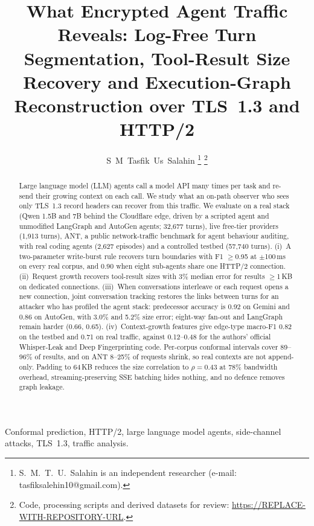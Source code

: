 \documentclass[journal]{IEEEtran}
\newcommand{\repourl}{\url{https://REPLACE-WITH-REPOSITORY-URL}} %
\begin{document}
\title{What Encrypted Agent Traffic Reveals: Log-Free Turn Segmentation, Tool-Result Size Recovery and Execution-Graph Reconstruction over TLS~1.3 and HTTP/2}
\author{S~M~Tasfik~Us~Salahin
\thanks{S.~M.~T.~U.~Salahin is an independent researcher (e-mail: tasfiksalehin10@gmail.com).}
\thanks{Code, processing scripts and derived datasets for review: \repourl.}}
\maketitle

\begin{abstract}
Large language model (LLM) agents call a model API many times per task and re-send their growing context on each call. We study what an on-path observer who sees only TLS~1.3 record headers can recover from this traffic. We evaluate on a real stack (Qwen 1.5B and 7B behind the Cloudflare edge, driven by a scripted agent and unmodified LangGraph and AutoGen agents; 32,677 turns), live free-tier providers (1,913 turns), ANT, a public network-traffic benchmark for agent behaviour auditing, with real coding agents (2,627 episodes) and a controlled testbed (57,740 turns). (i)~A two-parameter write-burst rule recovers turn boundaries with F1 $\geq$0.95 at $\pm$100\,ms on every real corpus, and 0.90 when eight sub-agents share one HTTP/2 connection. (ii)~Request growth recovers tool-result sizes with 3\% median error for results $\geq$1\,KB on dedicated connections. (iii)~When conversations interleave or each request opens a new connection, joint conversation tracking restores the links between turns for an attacker who has profiled the agent stack: predecessor accuracy is 0.92 on Gemini and 0.86 on AutoGen, with 3.0\% and 5.2\% size error; eight-way fan-out and LangGraph remain harder (0.66, 0.65). (iv)~Context-growth features give edge-type macro-F1 0.82 on the testbed and 0.71 on real traffic, against 0.12--0.48 for the authors' official Whisper-Leak and Deep Fingerprinting code. Per-corpus conformal intervals cover 89--96\% of results, and on ANT 8--25\% of requests shrink, so real contexts are not append-only. Padding to 64\,KB reduces the size correlation to $\rho = 0.43$ at 78\% bandwidth overhead, streaming-preserving SSE batching hides nothing, and no defence removes graph leakage.
\end{abstract}

\begin{IEEEkeywords}
Conformal prediction, HTTP/2, large language model agents, side-channel attacks, TLS~1.3, traffic analysis.
\end{IEEEkeywords}
\end{document}
